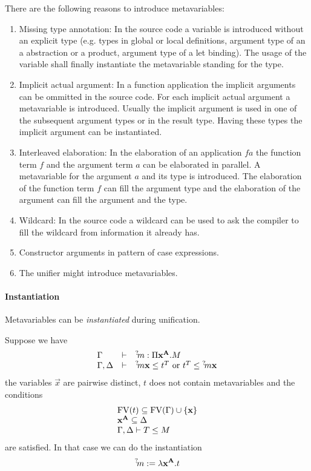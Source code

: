 There are the following reasons to introduce metavariables:
\begin{enumerate}
    \item Missing type annotation: In the source code a variable is introduced
        without an explicit type (e.g. types in global or local definitions,
        argument type of an a abstraction or a product, argument type of a let
        binding). The usage of the variable shall finally instantiate the
        metavariable standing for the type.

    \item Implicit actual argument: In a function application the implicit
        arguments can be ommitted in the source code. For each implicit actual
        argument a metavariable is introduced. Usually the implicit argument is
        used in one of the subsequent argument types or in the result type.
        Having these types the implicit argument can be instantiated.

    \item Interleaved elaboration: In the elaboration of an application $f a$
        the function term $f$ and the argument term $a$ can be elaborated in
        parallel. A metavariable for the argument $a$ and its type is
        introduced. The elaboration of the function term $f$ can fill the
        argument type and the elaboration of the argument can fill the argument
        and the type.

    \item Wildcard: In the source code a wildcard can be used to ask the
        compiler to fill the wildcard from information it already has.

    \item Constructor arguments in pattern of case expressions.

    \item The unifier might introduce metavariables.
\end{enumerate}





\paragraph{Instantiation}
Metavariables can be \emph{instantiated} during unification.

Suppose we have
$$
\begin{array}{lllll}
    \Gamma &\vdash& {{}^? \kern-0.2em m}: \Pi {\mathbf x}^{{\mathbf A}}. M
    \\
    \Gamma, \Delta & \vdash & {{}^? \kern-0.2em m} {\mathbf x} \le t^T
    \text{ or }
    t^T \le {{}^? \kern-0.2em m} {\mathbf x}
\end{array}
$$
the variables $\vec x$ are pairwise distinct, $t$ does not contain metavariables
and the conditions
$$
\begin{array}{lllll} 
    {\text{FV}}(t) \subseteq {\text{FV}}(\Gamma) \cup {\{{\mathbf x}\}}
    \\
    {\mathbf x}^{{\mathbf A}} \subseteq \Delta
    \\
    \Gamma,\Delta \vdash T \le M
 \end{array}
$$
are satisfied. In that case we can do the instantiation
$$
{{}^? \kern-0.2em m} := \lambda {\mathbf x}^{{\mathbf A}}. t
$$


